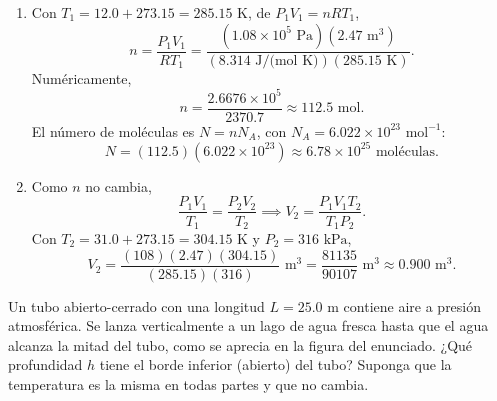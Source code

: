 \documentclass[12pt,a4paper]{article}
\begin{document}
    \begin{solucion}
        \begin{enumerate}
            \item[(a)] Con $T_{1}=12.0+273.15=285.15\text{ K}$, de $P_{1}V_{1}=nRT_{1}$,
            \begin{equation*}
                n=\frac{P_{1}V_{1}}{RT_{1}}=\frac{(1.08\times10^{5}\text{ Pa})(2.47\text{ m}^{3})}{(8.314\text{ J/(mol K)})(285.15\text{ K})}.
            \end{equation*}
            Numéricamente,
            \begin{equation*}
                n=\frac{2.6676\times10^{5}}{2370.7}\approx112.5\text{ mol}.
            \end{equation*}
            El número de moléculas es $N=nN_{A}$, con $N_{A}=6.022\times10^{23}\text{ mol}^{-1}$:
            \begin{equation*}
                N=(112.5)(6.022\times10^{23})\approx6.78\times10^{25}\text{ moléculas}.
            \end{equation*}
            \item[(b)] Como $n$ no cambia,
            \begin{equation*}
                \frac{P_{1}V_{1}}{T_{1}}=\frac{P_{2}V_{2}}{T_{2}}
                \implies
                V_{2}=\frac{P_{1}V_{1}T_{2}}{T_{1}P_{2}}.
            \end{equation*}
            Con $T_{2}=31.0+273.15=304.15\text{ K}$ y $P_{2}=316\text{ kPa}$,
            \begin{equation*}
                V_{2}=\frac{(108)(2.47)(304.15)}{(285.15)(316)}\text{ m}^{3}
                =\frac{81135}{90107}\text{ m}^{3}\approx0.900\text{ m}^{3}.
            \end{equation*}
        \end{enumerate}
    \end{solucion}

    \begin{problema}
        Un tubo abierto-cerrado con una longitud $L=25.0\text{ m}$ contiene aire a presión
        atmosférica. Se lanza verticalmente a un lago de agua fresca hasta que el agua alcanza
        la mitad del tubo, como se aprecia en la figura del enunciado. ¿Qué profundidad $h$
        tiene el borde inferior (abierto) del tubo? Suponga que la temperatura es la misma en
        todas partes y que no cambia.
    \end{problema}
\end{document}
